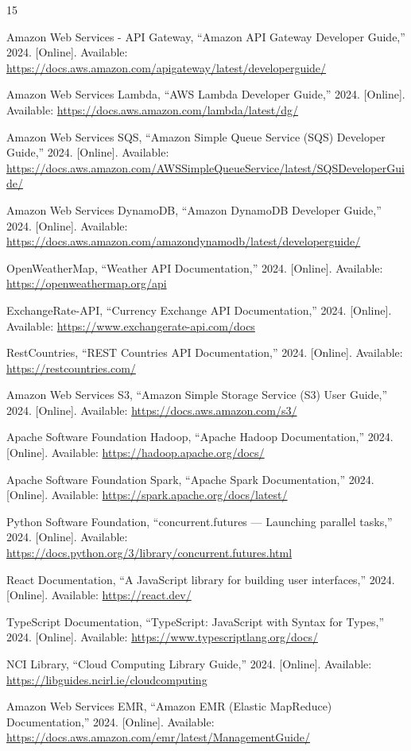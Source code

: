\documentclass[conference]{IEEEtran}
\begin{document}
\begin{thebibliography}{15}

Amazon Web Services - API Gateway, ``Amazon API Gateway Developer Guide,'' 2024. [Online]. Available: \url{https://docs.aws.amazon.com/apigateway/latest/developerguide/}

Amazon Web Services Lambda, ``AWS Lambda Developer Guide,'' 2024. [Online]. Available: \url{https://docs.aws.amazon.com/lambda/latest/dg/}

Amazon Web Services SQS, ``Amazon Simple Queue Service (SQS) Developer Guide,'' 2024. [Online]. Available: \url{https://docs.aws.amazon.com/AWSSimpleQueueService/latest/SQSDeveloperGuide/}

Amazon Web Services DynamoDB, ``Amazon DynamoDB Developer Guide,'' 2024. [Online]. Available: \url{https://docs.aws.amazon.com/amazondynamodb/latest/developerguide/}

OpenWeatherMap, ``Weather API Documentation,'' 2024. [Online]. Available: \url{https://openweathermap.org/api}

ExchangeRate-API, ``Currency Exchange API Documentation,'' 2024. [Online]. Available: \url{https://www.exchangerate-api.com/docs}

RestCountries, ``REST Countries API Documentation,'' 2024. [Online]. Available: \url{https://restcountries.com/}

Amazon Web Services S3, ``Amazon Simple Storage Service (S3) User Guide,'' 2024. [Online]. Available: \url{https://docs.aws.amazon.com/s3/}

Apache Software Foundation Hadoop, ``Apache Hadoop Documentation,'' 2024. [Online]. Available: \url{https://hadoop.apache.org/docs/}

Apache Software Foundation Spark, ``Apache Spark Documentation,'' 2024. [Online]. Available: \url{https://spark.apache.org/docs/latest/}

Python Software Foundation, ``concurrent.futures --- Launching parallel tasks,'' 2024. [Online]. Available: \url{https://docs.python.org/3/library/concurrent.futures.html}

React Documentation, ``A JavaScript library for building user interfaces,'' 2024. [Online]. Available: \url{https://react.dev/}

TypeScript Documentation, ``TypeScript: JavaScript with Syntax for Types,'' 2024. [Online]. Available: \url{https://www.typescriptlang.org/docs/}

NCI Library, ``Cloud Computing Library Guide,'' 2024. [Online]. Available: \url{https://libguides.ncirl.ie/cloudcomputing}

Amazon Web Services EMR, ``Amazon EMR (Elastic MapReduce) Documentation,'' 2024. [Online]. Available: \url{https://docs.aws.amazon.com/emr/latest/ManagementGuide/}

\end{thebibliography}
\end{document}
